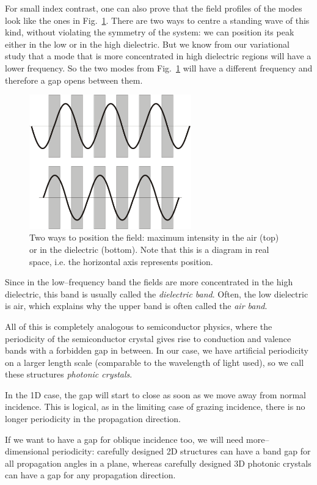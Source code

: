 For small index contrast, one can also prove that the field profiles of the modes look like the ones in Fig.~\ref{fig-field-placement}. There are two ways to centre a standing wave of this kind, without violating the symmetry of the system: we can position its peak either in the low or in the high dielectric. But we know from our variational study that a mode that is more concentrated in high dielectric regions will have a lower frequency. So the two modes from Fig.~\ref{fig-field-placement} will have a different frequency and therefore a gap opens between them.

\begin{figure}
\centering
\includegraphics[width=7cm]{periodic/figures/field_placement}
\caption{Two ways to position the field: maximum intensity in the air (top) or in the dielectric (bottom). Note that this is a diagram in real space, i.e. the horizontal axis represents position.}
\label{fig-field-placement}
\end{figure}

Since in the low--frequency band the fields are more concentrated in the high dielectric, this band is usually called the \emph{dielectric band}. Often, the low dielectric is air, which explains why the upper band is often called the \emph{air band}.

All of this is completely analogous to semiconductor physics, where the periodicity of the semiconductor crystal gives rise to conduction and valence bands with a forbidden gap in between. In our case, we have artificial periodicity on a larger length scale (comparable to the wavelength of light used), so we call these structures \emph{photonic crystals}.

In the 1D case, the gap will start to close as soon as we move away from normal incidence. This is logical, as in the limiting case of grazing incidence, there is no longer periodicity in the propagation direction.

If we want to have a gap for oblique incidence too, we will need more--dimensional periodicity: carefully designed 2D structures can have a band gap for all propagation angles in a plane, whereas carefully designed 3D photonic crystals can have a gap for any propagation direction.

